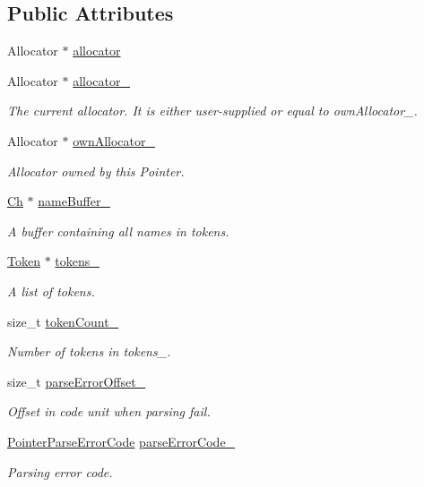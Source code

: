 \subsection*{Public Attributes}
\begin{DoxyCompactItemize}
\item 
Allocator $\ast$ \hyperlink{classGenericPointer_aeb61ba8e67260b43090791eeca8b90e0}{allocator}
\item 
Allocator $\ast$ \hyperlink{classGenericPointer_a331cffeec161b80ea18ac3f1562851bf}{allocator\+\_\+}
\begin{DoxyCompactList}\small\item\em The current allocator. It is either user-\/supplied or equal to own\+Allocator\+\_\+. \end{DoxyCompactList}\item 
Allocator $\ast$ \hyperlink{classGenericPointer_a99b51c07419ee17d57e97774d8ee63ab}{own\+Allocator\+\_\+}
\begin{DoxyCompactList}\small\item\em Allocator owned by this Pointer. \end{DoxyCompactList}\item 
\hyperlink{classGenericPointer_ab292356c11b4015c98d21b966b11f285}{Ch} $\ast$ \hyperlink{classGenericPointer_a2fd627c663483ad08e4f26707ea5ad86}{name\+Buffer\+\_\+}
\begin{DoxyCompactList}\small\item\em A buffer containing all names in tokens. \end{DoxyCompactList}\item 
\hyperlink{structGenericPointer_1_1Token}{Token} $\ast$ \hyperlink{classGenericPointer_a997793c66ea1a264089c37c8731eb138}{tokens\+\_\+}
\begin{DoxyCompactList}\small\item\em A list of tokens. \end{DoxyCompactList}\item 
size\+\_\+t \hyperlink{classGenericPointer_a7051cf59af6622542a050bd0ff0340f8}{token\+Count\+\_\+}
\begin{DoxyCompactList}\small\item\em Number of tokens in tokens\+\_\+. \end{DoxyCompactList}\item 
size\+\_\+t \hyperlink{classGenericPointer_ad103ed62e206319f1f0f4aa271866e37}{parse\+Error\+Offset\+\_\+}
\begin{DoxyCompactList}\small\item\em Offset in code unit when parsing fail. \end{DoxyCompactList}\item 
\hyperlink{group__RAPIDJSON__ERRORS_gacb2e274f33e54d91b96e9883a99a98be}{Pointer\+Parse\+Error\+Code} \hyperlink{classGenericPointer_a8898ec432dc40b28f79db78dc4ca83e0}{parse\+Error\+Code\+\_\+}
\begin{DoxyCompactList}\small\item\em Parsing error code. \end{DoxyCompactList}\end{DoxyCompactItemize}
